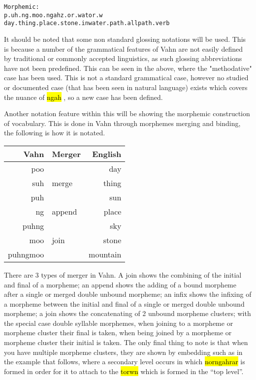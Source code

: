 \documentclass{article}
\newcommand{\hlv}[2][gray]{ {\sethlcolor{#1} \hl{#2}} }
\begin{document}
\begin{alltt}
    Morphemic:
    p.uh.ng.moo.ngah         z.or.wa        tor.w
    day.thing.place.stone.in water.path.all path.verb
\end{alltt}

It should be noted that some non standard glossing notations will be used. This is because a number
of the grammatical features of Vahn are not easily defined by traditional or commonly accepted
linguistics, as such glossing abbreviations have not been predefined. This can be seen in the above,
where the "methodative" case has been used. This is not a standard grammatical case, however no
studied or documented case (that has been seen in natural language) exists which covers the nuance
of \hlv{ngah}, so a new case has been defined.

Another notation feature within this will be showing the morphemic construction of vocabulary. This
is done in Vahn through morphemes merging and binding, the following is how it is notated.

\begin{table}[H]
    \centering
    \begin{tabular}{r|l||r}
        Vahn     & Merger & English  \\
        \hline\hline
        poo      &        & day      \\
        suh      & merge  & thing    \\
        \hline
        puh      &        & sun      \\
        ng       & append & place    \\
        \hline
        puhng    &        & sky      \\
        moo      & join   & stone    \\
        \hline \hline
        puhngmoo &        & mountain
    \end{tabular}
\end{table}

There are 3 types of merger in Vahn. A join shows the combining of the initial and final of a
morpheme; an append shows the adding of a bound morpheme after a single or merged double unbound
morpheme; an infix shows the infixing of a morpheme between the initial and final of a single or
merged double unbound morpheme; a join shows the concatenating of 2 unbound morpheme clusters; with
the special case double syllable morphemes, when joining to a morpheme or morpheme cluster their
final is taken, when being joined by a morpheme or morpheme cluster their initial is taken. The only
final thing to note is that when you have multiple morpheme clusters, they are shown by embedding
such as in the example that follows, where a secondary level occurs in which \hlv{norngahrar} is
formed in order for it to attach to the \hlv{torwn} which is formed in the ``top level''.
\end{document}
